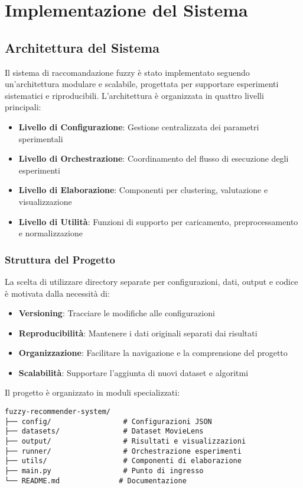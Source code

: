 \chapter{Implementazione del Sistema}
\label{chap:chap3}

\section{Architettura del Sistema}

Il sistema di raccomandazione fuzzy è stato implementato seguendo un'architettura modulare e scalabile, progettata per supportare esperimenti sistematici e riproducibili. L'architettura è organizzata in quattro livelli principali:

\begin{itemize}
    \item \textbf{Livello di Configurazione}: Gestione centralizzata dei parametri sperimentali
    \item \textbf{Livello di Orchestrazione}: Coordinamento del flusso di esecuzione degli esperimenti
    \item \textbf{Livello di Elaborazione}: Componenti per clustering, valutazione e visualizzazione
    \item \textbf{Livello di Utilità}: Funzioni di supporto per caricamento, preprocessamento e normalizzazione
\end{itemize}

\subsection{Struttura del Progetto}

La scelta di utilizzare directory separate per configurazioni, dati, output e codice è motivata dalla necessità di:
\begin{itemize}
    \item \textbf{Versioning}: Tracciare le modifiche alle configurazioni
    \item \textbf{Reproducibilità}: Mantenere i dati originali separati dai risultati
    \item \textbf{Organizzazione}: Facilitare la navigazione e la comprensione del progetto
    \item \textbf{Scalabilità}: Supportare l'aggiunta di nuovi dataset e algoritmi
\end{itemize}

Il progetto è organizzato in moduli specializzati:

\begin{verbatim}
fuzzy-recommender-system/
├── config/                 # Configurazioni JSON
├── datasets/               # Dataset MovieLens
├── output/                 # Risultati e visualizzazioni
├── runner/                 # Orchestrazione esperimenti
├── utils/                  # Componenti di elaborazione
├── main.py                 # Punto di ingresso
└── README.md              # Documentazione
\end{verbatim}

